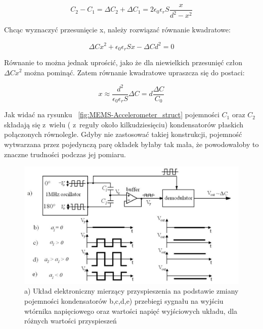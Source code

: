 \documentclass[11pt, twoside]{Thesis} %
\begin{document}
\begin{equation}
	C_2 - C_1 = \Delta{C_2} + \Delta{C_1} = 2\epsilon_0\epsilon_rS\frac{x}{d^2 - x^2}
\end{equation}

Chcąc wyznaczyć przesunięcie x, należy rozwiązać równanie kwadratowe:

\begin{equation}
	\Delta{C}x^2 + \epsilon_0\epsilon_rSx - \Delta{C}d^2 = 0
\end{equation}

Równanie to można jednak uprościć, jako że dla niewielkich przesunięć człon $\Delta{C}x^2$ można pominąć. Zatem równanie kwadratowe upraszcza się do postaci:

\begin{equation}
	x \approx \frac{d^2}{\epsilon_0\epsilon_rS}\Delta{C} = d\frac{\Delta{C}}{C_0}
	\label{x_to_c}
\end{equation}

Jak widać na rysunku ~\ref{fig:MEMS-Accelerometer_struct} pojemności $C_1$ oraz $C_2$ składają się z~wielu ( z~reguły około kilkudziesięciu)  kondensatorów płaskich połączonych równolegle. Gdyby nie zastosować takiej konstrukcji, pojemność wytwarzana przez pojedynczą parę okładek byłaby tak mała, że powodowałoby to znaczne trudności podczas jej pomiaru. 

\begin{figure}[H]
	\centering
	\includegraphics[scale=0.4]{Pictures/MEMS_accel_demod.png}
		\caption[Układ elektroniczny do pomiaru różnicy pojemności kondensatorów]{a) Układ elektroniczny mierzący przyspieszenia na podstawie zmiany pojemności kondensatorów b,c,d,e) przebiegi sygnału na wyjściu wtórnika napięciowego oraz wartości napięć wyjściowych układu, dla różnych wartości przyspieszeń~\cite{mems12, mems13}}
	\label{fig:MEMS_accel_demod}
\end{figure}
\end{document}
